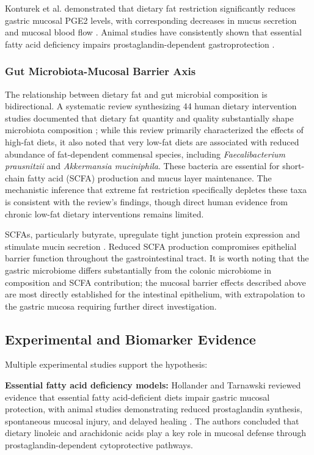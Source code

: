 \documentclass[review]{elsarticle}
\begin{document}
Konturek et al. demonstrated that dietary fat restriction significantly reduces gastric mucosal PGE2 levels, with corresponding decreases in mucus secretion and mucosal blood flow \cite{konturek1991}. Animal studies have consistently shown that essential fatty acid deficiency impairs prostaglandin-dependent gastroprotection \cite{schepp1988}.

\subsubsection{Gut Microbiota-Mucosal Barrier Axis}

The relationship between dietary fat and gut microbial composition is bidirectional. A systematic review synthesizing 44 human dietary intervention studies documented that dietary fat quantity and quality substantially shape microbiota composition \cite{wolters2019}; while this review primarily characterized the effects of high-fat diets, it also noted that very low-fat diets are associated with reduced abundance of fat-dependent commensal species, including \textit{Faecalibacterium prausnitzii} and \textit{Akkermansia muciniphila}. These bacteria are essential for short-chain fatty acid (SCFA) production and mucus layer maintenance. The mechanistic inference that extreme fat restriction specifically depletes these taxa is consistent with the review's findings, though direct human evidence from chronic low-fat dietary interventions remains limited.

SCFAs, particularly butyrate, upregulate tight junction protein expression and stimulate mucin secretion \cite{peng2009,willemsen2003}. Reduced SCFA production compromises epithelial barrier function throughout the gastrointestinal tract. It is worth noting that the gastric microbiome differs substantially from the colonic microbiome in composition and SCFA contribution; the mucosal barrier effects described above are most directly established for the intestinal epithelium, with extrapolation to the gastric mucosa requiring further direct investigation.

\subsection{Experimental and Biomarker Evidence}

Multiple experimental studies support the hypothesis:

\textbf{Essential fatty acid deficiency models:} Hollander and Tarnawski reviewed evidence that essential fatty acid-deficient diets impair gastric mucosal protection, with animal studies demonstrating reduced prostaglandin synthesis, spontaneous mucosal injury, and delayed healing \cite{hollander1991}. The authors concluded that dietary linoleic and arachidonic acids play a key role in mucosal defense through prostaglandin-dependent cytoprotective pathways.
\end{document}

